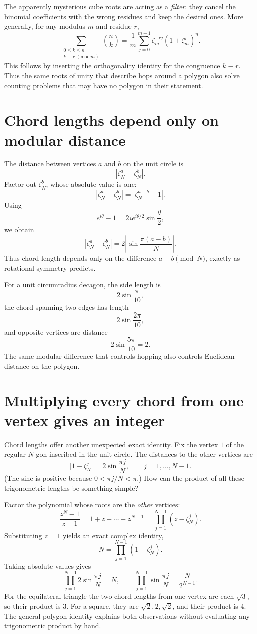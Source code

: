 The apparently mysterious cube roots are acting as a \emph{filter}: they cancel the binomial coefficients with the wrong residues and keep the desired ones. More generally, for any modulus $m$ and residue $r$,
\[
 \boxed{\sum_{\substack{0\le k\le n\\k\equiv r\;(\mathrm{mod}\,m)}}
     \binom nk
 =\frac1m\sum_{j=0}^{m-1}
      \zeta_m^{-rj}(1+\zeta_m^j)^n.}
\]
This follows by inserting the orthogonality identity for the congruence $k\equiv r$. Thus the same roots of unity that describe hops around a polygon also solve counting problems that may have no polygon in their statement.

\section{Chord lengths depend only on modular distance}

The distance between vertices \(a\) and \(b\) on the unit circle is
\[
  |\zeta_N^a-\zeta_N^b|.
\]
Factor out \(\zeta_N^b\), whose absolute value is one:
\[
  |\zeta_N^a-\zeta_N^b|
  =|\zeta_N^{a-b}-1|.
\]
Using
\[
  e^{i\theta}-1
  =2i e^{i\theta/2}\sin\frac\theta2,
\]
we obtain
\[
  \boxed{
  |\zeta_N^a-\zeta_N^b|
  =2\left|\sin\frac{\pi(a-b)}{N}\right|.}
\]
Thus chord length depends only on the difference \(a-b\pmod N\), exactly as rotational symmetry predicts.

For a unit circumradius decagon, the side length is
\[
  2\sin\frac{\pi}{10},
\]
the chord spanning two edges has length
\[
  2\sin\frac{2\pi}{10},
\]
and opposite vertices are distance
\[
  2\sin\frac{5\pi}{10}=2.
\]
The same modular difference that controls hopping also controls Euclidean distance on the polygon.

\section{Multiplying every chord from one vertex gives an integer}

Chord lengths offer another unexpected exact identity. Fix the vertex $1$ of the regular $N$-gon inscribed in the unit circle. The distances to the other vertices are
\[
 \bigl|1-\zeta_N^j\bigr|
 =2\sin\frac{\pi j}{N},
 \qquad j=1,\ldots,N-1.
\]
(The sine is positive because $0<\pi j/N<\pi$.) How can the product of all these trigonometric lengths be something simple?

Factor the polynomial whose roots are the \emph{other} vertices:
\[
 \frac{z^N-1}{z-1}
 =1+z+\cdots+z^{N-1}
 =\prod_{j=1}^{N-1}(z-\zeta_N^j).
\]
Substituting $z=1$ yields an exact complex identity,
\[
 N=\prod_{j=1}^{N-1}(1-\zeta_N^j).
\]
Taking absolute values gives
\[
 \boxed{\prod_{j=1}^{N-1}
           2\sin\frac{\pi j}{N}=N,}
 \qquad
 \boxed{\prod_{j=1}^{N-1}
           \sin\frac{\pi j}{N}
        =\frac{N}{2^{N-1}}.}
\]
For the equilateral triangle the two chord lengths from one vertex are each $\sqrt3$, so their product is $3$. For a square, they are $\sqrt2,2,\sqrt2$, and their product is $4$. The general polygon identity explains both observations without evaluating any trigonometric product by hand.

